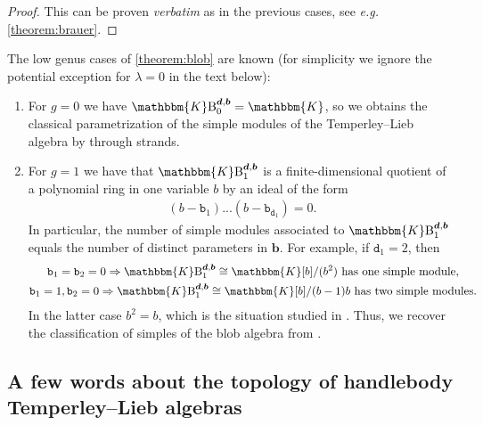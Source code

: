 \documentclass[a4paper,11pt]{amsart}
\newcommand{\eg}{\textsl{e.g.}}
\newcommand{\ver}{\textsl{verbatim}}
\renewcommand{\dots}{\text{...}}
\newcommand{\setstuff}[1]{\mathrm{#1}}
\newcommand{\KK}{\mathbbm{K}}
\newcommand{\bsym}[1]{\boldsymbol{#1}}
\newcommand{\varsym}[1]{\mathtt{#1}}
\newcommand{\bpar}{\bsym{b}}
\newcommand{\bvar}{\varsym{b}}
\newcommand{\dpar}{\bsym{d}}
\newcommand{\dvar}{\varsym{d}}
\numberwithin{equation}{section}
\let\fullref\autoref
\begin{document}
\begin{proof}
This can be proven {\ver} as in the previous cases, see {\eg} 
\fullref{theorem:brauer}.
\end{proof}

\begin{example}
The low genus cases of \fullref{theorem:blob} are known 
(for simplicity we ignore the potential exception 
for $\lambda=0$ in the text below):	

\begin{enumerate}

\item For $g=0$ we have $\KK\setstuff{B}_{0}^{\dpar,\bpar}=\KK$, so we obtains 
the classical parametrization of the simple modules of 
the Temperley--Lieb algebra by through strands.

\item For $g=1$ we have that $\KK\setstuff{B}_{1}^{\dpar,\bpar}$ is 
a finite-dimensional quotient of a polynomial ring in one variable $b$
by an ideal of the form
\begin{gather*}
(b-\bvar_{1})
\dots
(b-\bvar_{\dvar_{1}})=0.
\end{gather*} 
In particular, the number of simple modules associated to 
$\KK\setstuff{B}_{1}^{\dpar,\bpar}$ equals the number of distinct 
parameters in $\bpar$. For example, if $\dvar_{1}=2$, then
\begin{gather*}
\bvar_{1}=\bvar_{2}=0\Rightarrow
\KK\setstuff{B}_{1}^{\dpar,\bpar}\cong\KK[b]/(b^{2})
\text{ has one simple module},
\\
\bvar_{1}=1,\bvar_{2}=0\Rightarrow
\KK\setstuff{B}_{1}^{\dpar,\bpar}\cong\KK[b]/(b-1)b
\text{ has two simple modules}.
\end{gather*}
In the latter case $b^{2}=b$, 
which is the situation studied in \cite{MaSa-blob}.
Thus, we recover the classification of simples of the blob 
algebra from \cite{MaSa-blob}.
\end{enumerate}

\end{example}

\subsection{A few words about the topology of handlebody Temperley--Lieb algebras}\label{subsection:handlebody-tl-topology}
\end{document}
